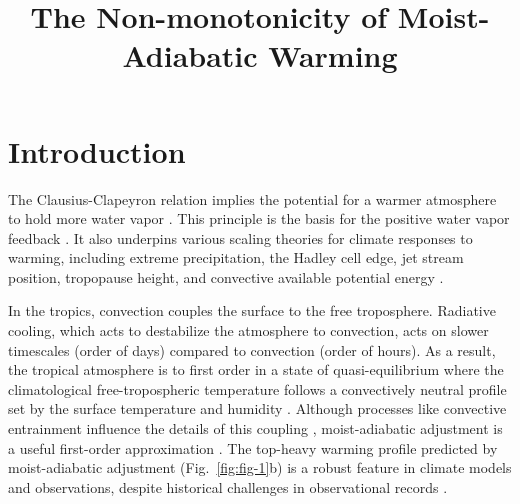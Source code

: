 \documentclass[draft]{ametsocV6.1}
\title{The Non-monotonicity of Moist-Adiabatic Warming}
\affiliation{\aff{a}{Department of Geosciences, Union College, Schenectady New York, USA}}
\begin{document}
\maketitle

%
\section{Introduction}

The Clausius-Clapeyron relation implies the potential for a warmer atmosphere to hold more water vapor \citep{emanuel1994}. This principle is the basis for the positive water vapor feedback \citep{held2000a}. It also underpins various scaling theories for climate responses to warming, including extreme precipitation, the Hadley cell edge, jet stream position, tropopause height, and convective available potential energy \citep[CAPE;][]{oGorman2015, shaw2016b, romps2016}. 

In the tropics, convection couples the surface to the free troposphere. Radiative cooling, which acts to destabilize the atmosphere to convection, acts on slower timescales (order of days) compared to convection (order of hours). As a result, the tropical atmosphere is to first order in a state of quasi-equilibrium where the climatological free-tropospheric temperature follows a convectively neutral profile set by the surface temperature and humidity \cite{arakawa1974}. Although processes like convective entrainment influence the details of this coupling \citep{miyawaki2020, keil2021}, moist-adiabatic adjustment is a useful first-order approximation \citep{held1993}. The top-heavy warming profile predicted by moist-adiabatic adjustment (Fig.~\ref{fig:fig-1}b) is a robust feature in climate models and observations, despite historical challenges in observational records \citep{vallis2015, santer2005}.
\end{document}
